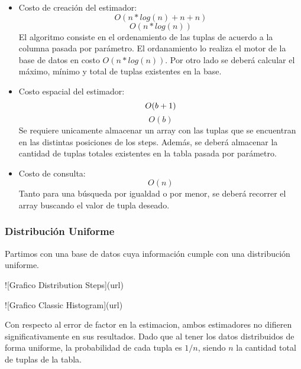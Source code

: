 \documentclass[10pt, a4paper,english,spanish,hidelinks]{article}
\begin{document}
\begin{itemize}

\item Costo de creación del estimador: 
\begin{equation}
O(n*log(n) + n + n)
\end{equation}
\begin{equation}
O(n*log(n))
\end{equation}
El algoritmo consiste en el ordenamiento de las tuplas de acuerdo a la columna pasada por parámetro. El ordanamiento lo realiza el motor de la base de datos en costo $O(n*log(n))$. Por otro lado se deberá calcular el máximo, mínimo y total de tuplas existentes en la base. 

\item Costo espacial del estimador:
\begin{equation}
O(b + 1) \\
\end{equation}
\begin{equation}
O(b)
\end{equation}
Se requiere unicamente almacenar un array con las tuplas que se encuentran en las distintas posiciones de los steps. Además, se deberá almacenar la cantidad de tuplas totales existentes en la tabla pasada por parámetro. 

\item Costo de consulta:
\begin{equation}
O(n)
\end{equation}
Tanto para una búsqueda por igualdad o por menor, se deberá recorrer el array buscando el valor de tupla deseado. 

\end{itemize}

\subsubsection{Distribución Uniforme}

Partimos con una base de datos cuya información cumple con una distribución uniforme.

![Grafico Distribution Steps](url)

![Grafico Classic Histogram](url)


Con respecto al error de factor en la estimacion, ambos estimadores no difieren significativamente en sus resultados. Dado que 
al tener los datos distribuidos de forma uniforme, la probabilidad de cada tupla es $1/n$, siendo $n$ la cantidad total de tuplas de la tabla. 
\end{document}
